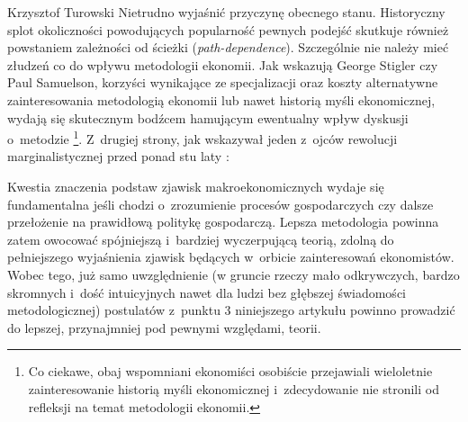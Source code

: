 \begin{artplenv}{Krzysztof Turowski}
Nietrudno wyjaśnić przyczynę obecnego stanu. Historyczny splot okoliczności powodujących popularność pewnych podejść
skutkuje również powstaniem zależności od ścieżki (\textit{path-dependence}). Szczególnie nie należy mieć złudzeń co do
wpływu metodologii ekonomii. Jak wskazują George Stigler czy Paul Samuelson, korzyści wynikające ze specjalizacji oraz
koszty alternatywne zainteresowania metodologią ekonomii lub nawet historią myśli ekonomicznej, wydają się skutecznym
bodźcem hamującym ewentualny wpływ dyskusji o~metodzie
\parencite{samuelson_out_1987,stigler_does_1969}\footnote{Co ciekawe, obaj wspomniani ekonomiści osobiście przejawiali wieloletnie zainteresowanie historią myśli
ekonomicznej i~zdecydowanie nie stronili od refleksji na temat metodologii ekonomii.}. Z~drugiej strony, jak wskazywał
jeden z~ojców rewolucji marginalistycznej przed ponad stu laty
\parencite{menger_investigations_1996}:


Kwestia znaczenia podstaw zjawisk makroekonomicznych wydaje się fundamentalna jeśli chodzi o~zrozumienie procesów
gospodarczych czy dalsze przełożenie na prawidłową politykę gospodarczą. Lepsza metodologia powinna zatem owocować
spójniejszą i~bardziej wyczerpującą teorią, zdolną do pełniejszego wyjaśnienia zjawisk będących w~orbicie zainteresowań
ekonomistów. Wobec tego, już samo uwzględnienie (w gruncie rzeczy mało odkrywczych, bardzo skromnych i~dość
intuicyjnych nawet dla ludzi bez głębszej świadomości metodologicznej) postulatów z~punktu 3 niniejszego artykułu
powinno prowadzić do lepszej, przynajmniej pod pewnymi względami, teorii.

\end{artplenv}
